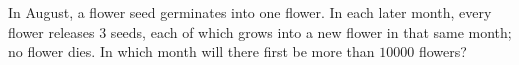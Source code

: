 In August, a flower seed germinates into one flower. In each later month, every flower releases $3$ seeds, each of which grows into a new flower in that same month; no flower dies. In which month will there first be more than $10000$ flowers?
